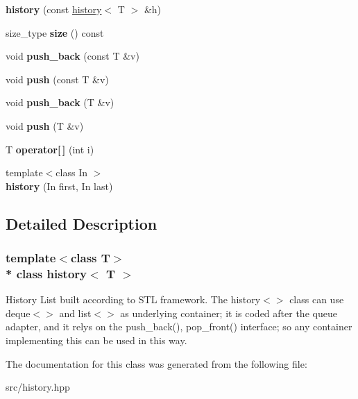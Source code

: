 \begin{DoxyCompactItemize}
\item 
{\bfseries history} (const \hyperlink{classhistory}{history}$<$ T $>$ \&h)\hypertarget{classhistory_a3f25e2da9763a1e2a96e28f46f7835c8}{}\label{classhistory_a3f25e2da9763a1e2a96e28f46f7835c8}

\item 
size\+\_\+type {\bfseries size} () const \hypertarget{classhistory_a30eb34a194bf01b71abfff552d0942fe}{}\label{classhistory_a30eb34a194bf01b71abfff552d0942fe}

\item 
void {\bfseries push\+\_\+back} (const T \&v)\hypertarget{classhistory_a8753c8fd5ff1fcbe856e84f42f644938}{}\label{classhistory_a8753c8fd5ff1fcbe856e84f42f644938}

\item 
void {\bfseries push} (const T \&v)\hypertarget{classhistory_aa5b18e0a9ccf6145e03399615c0cfe61}{}\label{classhistory_aa5b18e0a9ccf6145e03399615c0cfe61}

\item 
void {\bfseries push\+\_\+back} (T \&v)\hypertarget{classhistory_ad852efa132b4e3820f59a05b69ce1455}{}\label{classhistory_ad852efa132b4e3820f59a05b69ce1455}

\item 
void {\bfseries push} (T \&v)\hypertarget{classhistory_a996a47a8fc0ffe062c02c54f1ad66202}{}\label{classhistory_a996a47a8fc0ffe062c02c54f1ad66202}

\item 
T {\bfseries operator\mbox{[}$\,$\mbox{]}} (int i)\hypertarget{classhistory_ab22eb72aca68f8362d246e75c15aceb4}{}\label{classhistory_ab22eb72aca68f8362d246e75c15aceb4}

\item 
{\footnotesize template$<$class In $>$ }\\{\bfseries history} (In first, In last)\hypertarget{classhistory_a79481e7a0231fb12c48e5c0cfb49b9cc}{}\label{classhistory_a79481e7a0231fb12c48e5c0cfb49b9cc}

\end{DoxyCompactItemize}


\subsection{Detailed Description}
\subsubsection*{template$<$class T$>$\\*
class history$<$ T $>$}

History List built according to S\+TL framework. The history$<$$>$ class can use deque$<$$>$ and list$<$$>$ as underlying container; it is coded after the queue adapter, and it relys on the push\+\_\+back(), pop\+\_\+front() interface; so any container implementing this can be used in this way. 

The documentation for this class was generated from the following file\+:\begin{DoxyCompactItemize}
\item 
src/history.\+hpp\end{DoxyCompactItemize}
